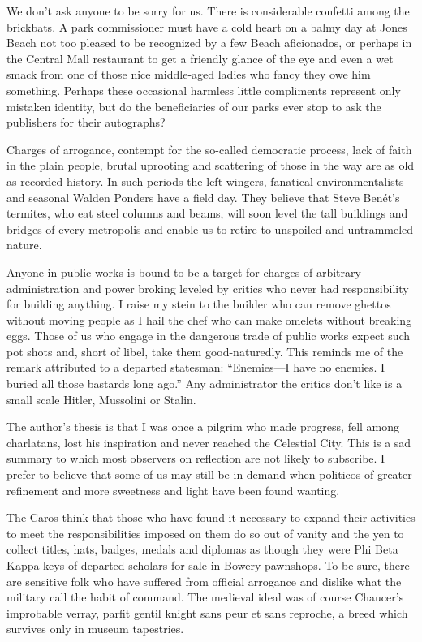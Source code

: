 \documentclass[11pt,letterpaper]{article}
\begin{document}
We don't ask anyone to be sorry for us. There is considerable confetti among the brickbats. A park commissioner must have a cold heart on a balmy day at Jones Beach not too pleased to be recognized by a few Beach aficionados, or perhaps in the Central Mall restaurant to get a friendly glance of the eye and even a wet smack from one of those nice middle-aged ladies who fancy they owe him something. Perhaps these occasional harmless little compliments represent only mistaken identity, but do the beneficiaries of our parks ever stop to ask the publishers for their autographs?

Charges of arrogance, contempt for the so-called democratic process, lack of faith in the plain people, brutal uprooting and scattering of those in the way are as old as recorded history. In such periods the left wingers, fanatical environmentalists and seasonal Walden Ponders have a field day. They believe that Steve Ben\'et's termites, who eat steel columns and beams, will soon level the tall buildings and bridges of every metropolis and enable us to retire to unspoiled and untrammeled nature.

Anyone in public works is bound to be a target for charges of arbitrary administration and power broking leveled by critics who never had responsibility for building anything. I raise my stein to the builder who can remove ghettos without moving people as I hail the chef who can make omelets without breaking eggs. Those of us who engage in the dangerous trade of public works expect such pot shots and, short of libel, take them good-naturedly. This reminds me of the remark attributed to a departed statesman: \enquote{Enemies---I have no enemies. I buried all those bastards long ago.} Any administrator the critics don't like is a small scale Hitler, Mussolini or Stalin.

The author's thesis is that I was once a pilgrim who made progress, fell among charlatans, lost his inspiration and never reached the Celestial City. This is a sad summary to which most observers on reflection are not likely to subscribe. I prefer to believe that some of us may still be in demand when politicos of greater refinement and more sweetness and light have been found wanting.

The Caros think that those who have found it necessary to expand their activities to meet the responsibilities imposed on them do so out of vanity and the yen to collect titles, hats, badges, medals and diplomas as though they were Phi Beta Kappa keys of departed scholars for sale in Bowery pawnshops. To be sure, there are sensitive folk who have suffered from official arrogance and dislike what the military call the habit of command. The medieval ideal was of course Chaucer's improbable verray, parfit gentil knight sans peur et sans reproche, a breed which survives only in museum tapestries.
\end{document}
